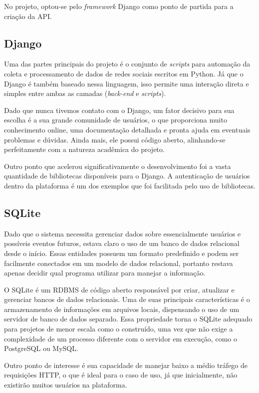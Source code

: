 No projeto, optou-se pelo \textit{framework} Django como ponto de partida para
a criação da \acs{API}.

\subsection{Django}

Uma das partes principais do projeto é o conjunto de \textit{scripts} para
automação da coleta e processamento de dados de redes sociais escritos em
Python. Já que o Django é também baseado nessa linguagem, isso permite uma
interação direta e simples entre ambas as camadas (\textit{back-end} e
\textit{scripts}).

Dado que nunca tivemos contato com o Django, um fator decisivo para sua escolha
é a sua grande comunidade de usuários, o que proporciona muito conhecimento
online, uma documentação detalhada e pronta ajuda em eventuais problemas e
dúvidas. Ainda mais, ele possui código aberto, alinhando-se perfeitamente com a
natureza acadêmica do projeto.

Outro ponto que acelerou significativamente o desenvolvimento foi a vasta
quantidade de bibliotecas disponíveis para o Django. A autenticação de usuários
dentro da plataforma é um dos exemplos que foi facilitada pelo uso de
bibliotecas.

\subsection{SQLite}

Dado que o sistema necessita gerenciar dados sobre essencialmente usuários e
possíveis eventos futuros, estava claro o uso de um banco de dados relacional
desde o início. Essas entidades possuem um formato predefinido e podem ser
facilmente conectados em um modelo de dados relacional, portanto restava apenas
decidir qual programa utilizar para manejar a informação.

O SQLite é um \ac{RDBMS} de código aberto responsável por criar, atualizar e
gerenciar bancos de dados relacionais. Uma de suas principais características é
o armazenamento de informações em arquivos locais, dispensando o uso de um
servidor de banco de dados separado. Essa propriedade torna o SQLite adequado
para projetos de menor escala como o construído, uma vez que não exige a
complexidade de um processo diferente com o servidor em execução, como o
PostgreSQL ou MySQL.

Outro ponto de interesse é sua capacidade de manejar baixo a médio tráfego de
requisições \acs{HTTP}\label{acro:HTTP}, o que é ideal para o caso de uso, já
que inicialmente, não existirão muitos usuários na plataforma.

